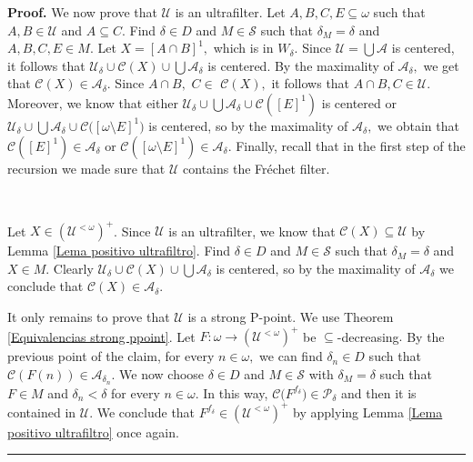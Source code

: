 \documentclass[10pt,a4paper]{amsart}
\newenvironment{proof}[1][Proof]{\noindent\textbf{#1.} }{\ \rule{0.5em}{0.5em}}
\begin{document}
\begin{proof}
We now prove that $\mathcal{U}$ is an ultrafilter. Let $A,B,C,E\subseteq
\omega$ such that $A,B\in\mathcal{U}$ and $A\subseteq C.$ Find $\delta\in D$
and $M\in\mathcal{S}$ such that $\delta_{M}=\delta$ and $A,B,C,E\in M.$ Let
$X=\left[  A\cap B\right]  ^{1},$ which is in $W_{\delta}.$ Since $\mathcal{U=%
{\textstyle\bigcup}
A}$ is centered, it follows that $\mathcal{U}_{\delta}\cup\mathcal{C}\left(
X\right)  \cup%
{\textstyle\bigcup}
\mathcal{A}_{\delta}$ is centered. By the maximality of $\mathcal{A}_{\delta
},$ we get that $\mathcal{C}\left(  X\right)  \in\mathcal{A}_{\delta}.$ Since
$A\cap B,$ $C\in$ $\mathcal{C}\left(  X\right)  ,$ it follows that $A\cap
B,C\in\mathcal{U}.$ Moreover, we know that either $\mathcal{U}_{\delta}\cup%
{\textstyle\bigcup}
\mathcal{A}_{\delta}\cup\mathcal{C}(\left[  E\right]  ^{1})$ is centered or
$\mathcal{U}_{\delta}\cup%
{\textstyle\bigcup}
\mathcal{A}_{\delta}\cup\mathcal{C(}\left[  \omega\setminus E\right]  ^{1})$
is centered, so by the maximality of $\mathcal{A}_{\delta},$ we obtain that
$\mathcal{C}\left(  \left[  E\right]  ^{1}\right)  \in\mathcal{A}_{\delta}$ or
$\mathcal{C}\left(  \left[  \omega\setminus E\right]  ^{1}\right)
\in\mathcal{A}_{\delta}.$ Finally, recall that in the first step of the
recursion we made sure that $\mathcal{U}$ contains the Fr\'{e}chet filter.

\qquad\qquad\qquad\ \ 

Let $X\in\left(  \mathcal{U}^{<\omega}\right)  ^{+}$. Since $\mathcal{U}$ is
an ultrafilter, we know that $\mathcal{C}\left(  X\right)  \subseteq
\mathcal{U}$ by Lemma \ref{Lema positivo ultrafiltro}. Find $\delta\in D$ and
$M\in\mathcal{S}$ such that $\delta_{M}=\delta$ and $X\in M.$ Clearly
$\mathcal{U}_{\delta}\cup\mathcal{C}\left(  X\right)  \cup%
{\textstyle\bigcup}
\mathcal{A}_{\delta}$ is centered, so by the maximality of $\mathcal{A}%
_{\delta}$ we conclude that $\mathcal{C}\left(  X\right)  \in\mathcal{A}%
_{\delta}.$

\qquad\qquad

It only remains to prove that $\mathcal{U}$ is a strong \textsf{P}-point. We
use Theorem \ref{Equivalencias strong ppoint}. Let $F:\omega\longrightarrow
\left(  \mathcal{U}^{<\omega}\right)  ^{+}$ be $\subseteq$-decreasing$.$ By
the previous point of the claim, for every $n\in\omega,$ we can find
$\delta_{n}\in D$ such that $\mathcal{C}\left(  F\left(  n\right)  \right)
\in\mathcal{A}_{\delta_{n}}.$ We now choose $\delta\in D$ and $M\in
\mathcal{S}$ with $\delta_{M}=\delta$ such that $F\in M$ and $\delta
_{n}<\delta$ for every $n\in\omega.$ In this way, $\mathcal{C(}F^{f_{\delta}%
})\in\mathcal{P}_{\delta}$ and then it is contained in $\mathcal{U}.$ We
conclude that $F^{f_{\delta}}\in\left(  \mathcal{U}^{<\omega}\right)  ^{+}$ by
applying Lemma \ref{Lema positivo ultrafiltro} once again.
\end{proof}
\end{document}
